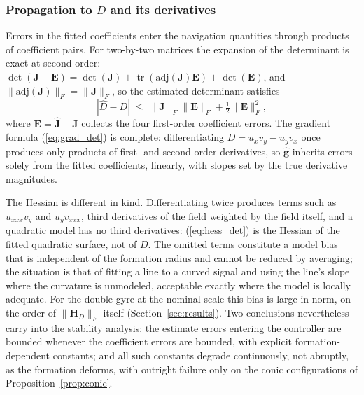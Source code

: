 \documentclass[lettersize,journal]{IEEEtran}
\begin{document}
\subsubsection{Propagation to $D$ and its derivatives}
Errors in the fitted coefficients enter the navigation quantities through
products of coefficient pairs. For two-by-two matrices the expansion of
the determinant is exact at second order:
$\det(\mathbf{J} + \mathbf{E}) = \det(\mathbf{J}) +
\operatorname{tr}(\mathrm{adj}(\mathbf{J})\mathbf{E}) + \det(\mathbf{E})$,
and $\|\mathrm{adj}(\mathbf{J})\|_F = \|\mathbf{J}\|_F$, so the estimated
determinant satisfies
\begin{equation}
    |\hat{D} - D| \;\leq\; \|\mathbf{J}\|_F \|\mathbf{E}\|_F
    + \tfrac{1}{2}\|\mathbf{E}\|_F^2,
    \label{eq:det_perturbation}
\end{equation}
where $\mathbf{E} = \hat{\mathbf{J}} - \mathbf{J}$ collects the four
first-order coefficient errors. The gradient formula (\ref{eq:grad_det})
is complete: differentiating $D = u_x v_y - u_y v_x$ once produces only
products of first- and second-order derivatives, so $\hat{\mathbf{g}}$
inherits errors solely from the fitted coefficients, linearly, with
slopes set by the true derivative magnitudes.

The Hessian is different in kind. Differentiating twice produces terms
such as $u_{xxx} v_y$ and $u_y v_{xxx}$, third derivatives of the field
weighted by the field itself, and a quadratic model has no third
derivatives: (\ref{eq:hess_det}) is the Hessian of the fitted quadratic
surface, not of $D$. The omitted terms constitute a model bias that is
independent of the formation radius and cannot be reduced by averaging;
the situation is that of fitting a line to a curved signal and using the
line's slope where the curvature is unmodeled, acceptable exactly where
the model is locally adequate. For the double gyre at the nominal scale
this bias is large in norm, on the order of $\|\mathbf{H}_D\|_F$ itself
(Section~\ref{sec:results}). Two conclusions nevertheless carry into the
stability analysis: the estimate errors entering the controller are
bounded whenever the coefficient errors are bounded, with explicit
formation-dependent constants; and all such constants degrade
continuously, not abruptly, as the formation deforms, with outright
failure only on the conic configurations of
Proposition~\ref{prop:conic}.
\end{document}
